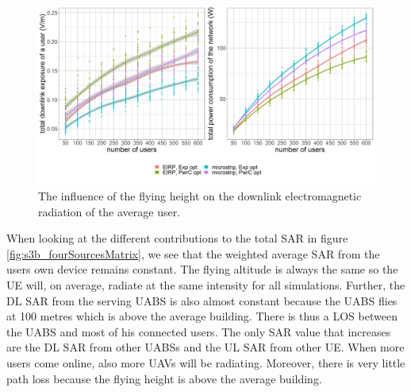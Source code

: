 \begin{figure}[h!]
  \includegraphics[width=\textwidth]{../results/s3/uvsdlAndPc.png}
  \caption{The influence of the flying height on the downlink electromagnetic radiation of the average user.}
  \label{fig:s3b_dlAndPC}
\end{figure}

When looking at the different contributions to the total \gls{SAR} in figure \ref{fig:s3b_fourSourcesMatrix}, 
we see that the weighted average 
\gls{SAR} from the users own device remains constant. The flying altitude is always the same so the
 \gls{UE} will, on average, radiate at the same intensity for all simulations.
 Further, the \gls{DL} \gls{SAR} from the serving \gls{UABS} is also almost constant  because the \gls{UABS} flies at 100 metres which is
above the average building. There is thus a \gls{LOS} between the \gls{UABS} and most of his connected users.
The only \gls{SAR} value that increases are the \gls{DL} \gls{SAR} from other \gls{UABS}s and the \gls{UL} \gls{SAR} from other \gls{UE}. 
When more users come online, also more \gls{UAV}s will be radiating. Moreover, there is very little path loss because the flying height is above the average building.

